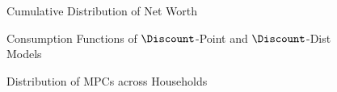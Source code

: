 \begin{figure}
\caption{Cumulative Distribution of Net Worth}
\label{CumWLevSCFCastanedaAndDistSevenNoAggShockPlot}
\end{figure}
\begin{figure}
\caption{Consumption Functions of $\Discount$-Point and $\Discount$-Dist Models}
\label{CFuncDistSevenPointAndHistNetWorthPlot}
\end{figure}
\begin{figure}
\caption{Distribution of MPCs across Households}
\label{MPCdist}
\end{figure}
